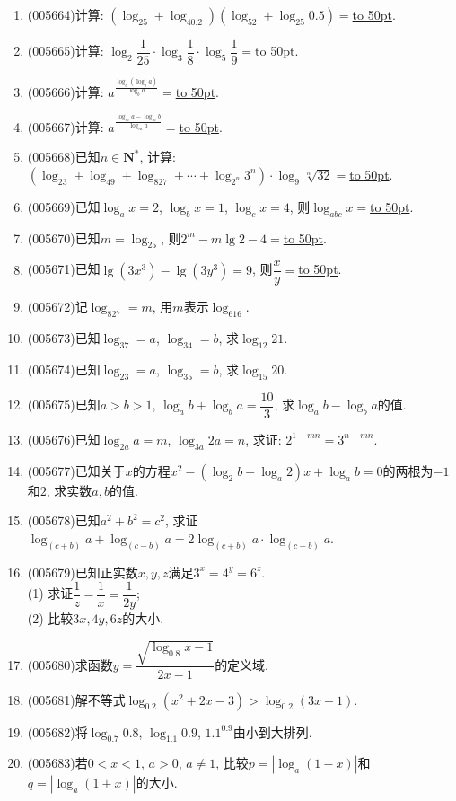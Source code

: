 \documentclass[10pt,a4paper]{article}
\newcommand{\blank}[1]{\underline{\hbox to #1pt{}}}
\begin{document}
\begin{enumerate}[1.]
\item {\tiny (005664)}计算: $(\log_25+\log_40.2)(\log_52+\log_{25}0.5)=$\blank{50}.
\item {\tiny (005665)}计算: $\log_2\dfrac 1{25}\cdot \log_3\dfrac 18\cdot \log_5\dfrac 19=$\blank{50}.
\item {\tiny (005666)}计算: $a^{\frac{\log_b(\log_ba)}{\log_ba}}=$\blank{50}.
\item {\tiny (005667)}计算: $a^{\frac{\log_ma-\log_mb}{\log_ma}}=$\blank{50}.
\item {\tiny (005668)}已知$n\in \mathbf{N}^*$, 计算: $(\log_23+\log_49+\log_827+\cdots +\log_{2^n}3^n)\cdot \log_9\sqrt [n]{32}=$\blank{50}.
\item {\tiny (005669)}已知$\log_ax=2$, $\log_bx=1$, $\log_cx=4$, 则$\log_{abc}x=$\blank{50}.
\item {\tiny (005670)}已知$m=\log_25$, 则$2^m-m\lg 2-4=$\blank{50}.
\item {\tiny (005671)}已知$\lg (3x^3)-\lg (3y^3)=9$, 则$\dfrac xy=$\blank{50}.
\item {\tiny (005672)}记$\log_827=m$, 用$m$表示$\log_616$.
\item {\tiny (005673)}已知$\log_37=a$, $\log_34=b$, 求$\log_{12}21$.
\item {\tiny (005674)}已知$\log_23=a$, $\log_35=b$, 求$\log_{15}20$.
\item {\tiny (005675)}已知$a>b>1$, $\log_ab+\log_ba=\dfrac{10}3$, 求$\log_ab-\log_ba$的值.
\item {\tiny (005676)}已知$\log_{2a}a=m$, $\log_{3a}2a=n$, 求证: $2^{1-mn}=3^{n-mn}$.
\item {\tiny (005677)}已知关于$x$的方程$x^2-(\log_2b+\log_a2)x+\log_ab=0$的两根为$-1$和$2$, 求实数$a,b$的值.
\item {\tiny (005678)}已知$a^2+b^2=c^2$, 求证$\log_{(c+b)}a+\log_{(c-b)}a=2\log_{(c+b)}a\cdot \log_{(c-b)}a$.
\item {\tiny (005679)}已知正实数$x,y,z$满足$3^x=4^y=6^z$.\\
(1) 求证$\dfrac 1z-\dfrac 1x=\dfrac 1{2y}$;\\
(2) 比较$3x,4y,6z$的大小.
\item {\tiny (005680)}求函数$y=\dfrac{\sqrt {\log_{0.8}x-1}}{2x-1}$的定义域.
\item {\tiny (005681)}解不等式$\log_{0.2}(x^2+2x-3)>\log_{0.2}(3x+1)$.
\item {\tiny (005682)}将$\log_{0.7}0.8$, $\log_{1.1}0.9$, $1.1^{0.9}$由小到大排列.
\item {\tiny (005683)}若$0<x<1$, $a>0$, $a\ne 1$, 比较$p=|\log_a(1-x)|$和$q=|\log_a(1+x)|$的大小.

\end{enumerate}
\end{document}
